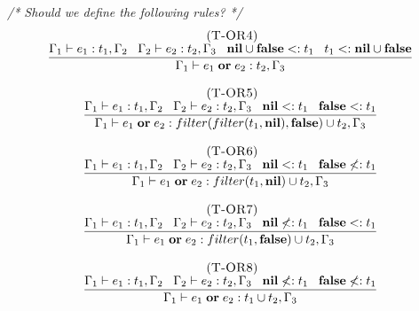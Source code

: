 \textit{/* Should we define the following rules? */}
\[
\begin{array}{c}
\begin{array}{c}
\; (\textsc{T-OR4})\\
\dfrac{\Gamma_{1} \vdash e_{1}:t_{1}, \Gamma_{2} \;\;\;
       \Gamma_{2} \vdash e_{2}:t_{2}, \Gamma_{3} \;\;\;
       \mathbf{nil} \cup \mathbf{false} <: t_{1} \;\;\;
       t_{1} <: \mathbf{nil} \cup \mathbf{false}}
      {\Gamma_{1} \vdash e_{1} \; \mathbf{or} \; e_{2}:t_{2}, \Gamma_{3}}
\end{array}
\\ \\
\begin{array}{c}
\; (\textsc{T-OR5})\\
\dfrac{\Gamma_{1} \vdash e_{1}:t_{1}, \Gamma_{2} \;\;\;
       \Gamma_{2} \vdash e_{2}:t_{2}, \Gamma_{3} \;\;\;
       \mathbf{nil} <: t_{1} \;\;\;
       \mathbf{false} <: t_{1}}
      {\Gamma_{1} \vdash e_{1} \; \mathbf{or} \; e_{2}:filter(filter(t_{1}, \mathbf{nil}), \mathbf{false}) \cup t_{2}, \Gamma_{3}}
\end{array}
\\ \\
\begin{array}{c}
\; (\textsc{T-OR6})\\
\dfrac{\Gamma_{1} \vdash e_{1}:t_{1}, \Gamma_{2} \;\;\;
       \Gamma_{2} \vdash e_{2}:t_{2}, \Gamma_{3} \;\;\;
       \mathbf{nil} <: t_{1} \;\;\;
       \mathbf{false} \not<: t_{1}}
      {\Gamma_{1} \vdash e_{1} \; \mathbf{or} \; e_{2}:filter(t_{1}, \mathbf{nil}) \cup t_{2}, \Gamma_{3}}
\end{array}
\\ \\
\begin{array}{c}
\; (\textsc{T-OR7})\\
\dfrac{\Gamma_{1} \vdash e_{1}:t_{1}, \Gamma_{2} \;\;\;
       \Gamma_{2} \vdash e_{2}:t_{2}, \Gamma_{3} \;\;\;
       \mathbf{nil} \not<: t_{1} \;\;\;
       \mathbf{false} <: t_{1}}
      {\Gamma_{1} \vdash e_{1} \; \mathbf{or} \; e_{2}:filter(t_{1}, \mathbf{false}) \cup t_{2}, \Gamma_{3}}
\end{array}
\\ \\
\begin{array}{c}
\; (\textsc{T-OR8})\\
\dfrac{\Gamma_{1} \vdash e_{1}:t_{1}, \Gamma_{2} \;\;\;
       \Gamma_{2} \vdash e_{2}:t_{2}, \Gamma_{3} \;\;\;
       \mathbf{nil} \not<: t_{1} \;\;\;
       \mathbf{false} \not<: t_{1}}
      {\Gamma_{1} \vdash e_{1} \; \mathbf{or} \; e_{2}:t_{1} \cup t_{2}, \Gamma_{3}}
\end{array}
\end{array}
\]

